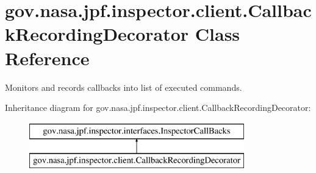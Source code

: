\hypertarget{classgov_1_1nasa_1_1jpf_1_1inspector_1_1client_1_1_callback_recording_decorator}{}\section{gov.\+nasa.\+jpf.\+inspector.\+client.\+Callback\+Recording\+Decorator Class Reference}
\label{classgov_1_1nasa_1_1jpf_1_1inspector_1_1client_1_1_callback_recording_decorator}


Monitors and records callbacks into list of executed commands.  


Inheritance diagram for gov.\+nasa.\+jpf.\+inspector.\+client.\+Callback\+Recording\+Decorator\+:\begin{figure}[H]
\begin{center}
\leavevmode
\includegraphics[height=2.000000cm]{classgov_1_1nasa_1_1jpf_1_1inspector_1_1client_1_1_callback_recording_decorator}
\end{center}
\end{figure}
